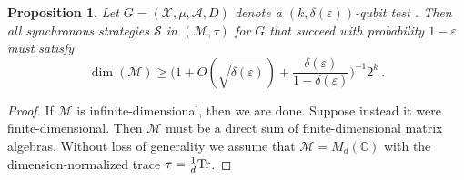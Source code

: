 \documentclass[11pt]{article}
\newtheorem{proposition}[theorem]{Proposition}
\theoremstyle{definition}
\newcommand{\strategy}{\mathscr{S}}
\newcommand{\Tr}{\mbox{\rm Tr}}
\newcommand{\C}{\ensuremath{\mathbb{C}}}
\newcommand{\mA}{\ensuremath{\mathcal{A}}}
\newcommand{\mM}{\ensuremath{\mathcal{M}}}
\newcommand{\mX}{\ensuremath{\mathcal{X}}}
\newcommand{\eps}{\varepsilon}
\begin{document}
\begin{proposition}
\label{prop:dim-test}
Let $G = (\mX,\mu,\mA,D)$ denote a $(k,\delta(\eps))$-qubit test . Then all synchronous strategies $\strategy$ in $(\mM,\tau)$ for $G$ that succeed with probability $1 - \eps$ must satisfy 
\[
\dim(\mM) \geq \Big( 1 + O(\sqrt{\delta(\eps)}) + \frac{\delta(\eps)}{1 - \delta(\eps)}\Big)^{-1} 2^k~.
\]
\end{proposition}
\begin{proof}
If $\mM$ is infinite-dimensional, then we are done. Suppose instead it were finite-dimensional. Then  $\mM$ must be  a direct sum of finite-dimensional matrix algebras.   Without loss of generality we assume that $\mM = M_{d}(\C)$ with the dimension-normalized trace $\tau = \frac{1}{d} \Tr$. 


\end{proof}
\end{document}
